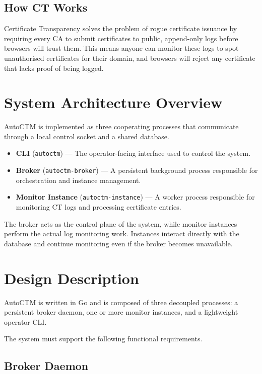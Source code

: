 \documentclass{article}
\begin{document}
\subsection{How CT Works}

Certificate Transparency solves the problem of rogue certificate issuance by 
requiring every CA to submit certificates to public, append-only logs before 
browsers will trust them. This means anyone can monitor these logs to spot 
unauthorised certificates for their domain, and browsers will reject any 
certificate that lacks proof of being logged.

\section{System Architecture Overview}

AutoCTM is implemented as three cooperating processes that communicate through 
a local control socket and a shared database.

\begin{itemize}
    \item \textbf{CLI} (\texttt{autoctm}) — The operator-facing interface used 
    to control the system.
    \item \textbf{Broker} (\texttt{autoctm-broker}) — A persistent background 
    process responsible for orchestration and instance management.
    \item \textbf{Monitor Instance} (\texttt{autoctm-instance}) — A worker 
    process responsible for monitoring CT logs and processing certificate 
    entries.
\end{itemize}

The broker acts as the control plane of the system, while monitor instances 
perform the actual log monitoring work. Instances interact directly with the 
database and continue monitoring even if the broker becomes unavailable.

\section{Design Description}

AutoCTM is written in Go and is composed of three decoupled processes: a 
persistent broker daemon, one or more monitor instances, and a lightweight 
operator CLI.

The system must support the following functional requirements.

\subsection{Broker Daemon}
\end{document}
